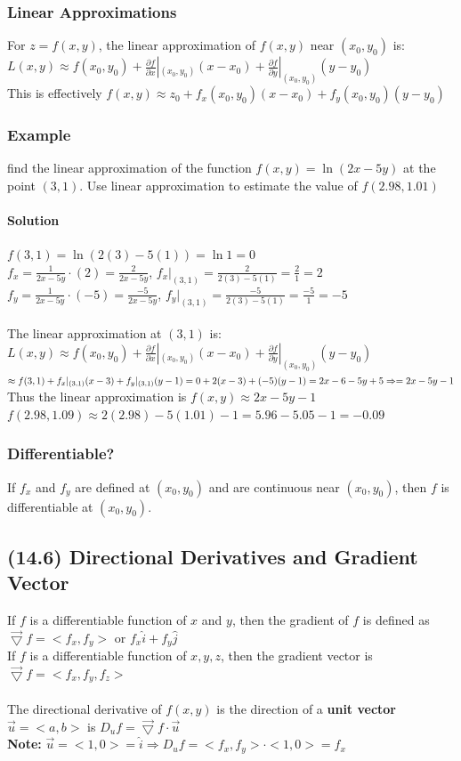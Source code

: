\documentclass{article}
\newcommand{\p}{\partial}
\newcommand{\tri}{\vec{\bigtriangledown}}
\begin{document}
\subsubsection{Linear Approximations}
For $z=f(x,y)$, the linear approximation of $f(x,y)$ near $(x_0,y_0)$ is:
\\$L(x,y)\approx f(x_0,y_0)+\frac{\p f}{\p x}|_{(x_0,y_0)}(x-x_0)+\frac{\p f}{\p y}|_{(x_0,y_0)}(y-y_0)$
\\This is effectively $f(x,y)\approx z_0+f_x(x_0,y_0)(x-x_0)+f_y(x_0,y_0)(y-y_0)$

\newpage\subsubsection{Example}
find the linear approximation of the function $f(x,y)=\ln(2x-5y)$ at the point $(3,1)$.
Use linear approximation to estimate the value of $f(2.98, 1.01)$
\paragraph{Solution} $f(3,1)=\ln(2(3)-5(1))=\ln1=0$
\\$f_x=\frac{1}{2x-5y}\cdot(2)=\frac{2}{2x-5y}$, $f_x|_{(3,1)}=\frac{2}{2(3)-5(1)}=\frac{2}{1}=2$
\\$f_y=\frac{1}{2x-5y}\cdot(-5)=\frac{-5}{2x-5y}$, $f_y|_{(3,1)}=\frac{-5}{2(3)-5(1)}=\frac{-5}{1}=-5$
\\\\The linear approximation at $(3,1)$ is: $L(x,y)\approx f(x_0,y_0)+\frac{\p f}{\p x}|_{(x_0,y_0)}(x-x_0)+\frac{\p f}{\p y}|_{(x_0,y_0)}(y-y_0)$
\\$\approx f(3,1)+f_x|_{(3,1)}(x-3)+f_y|_{(3,1)}(y-1)
\\=0+2(x-3)+(-5)(y-1)
\\=2x-6-5y+5\Rightarrow=2x-5y-1$
\\Thus the linear approximation is $f(x,y)\approx2x-5y-1$
\\$f(2.98,1.09)\approx2(2.98)-5(1.01)-1=5.96-5.05-1=-0.09$

\subsubsection{Differentiable?}
If $f_x$ and $f_y$ are defined at $(x_0,y_0)$ and are continuous near $(x_0,y_0)$,
then $f$ is differentiable at $(x_0,y_0)$.

\subsection{(14.6) Directional Derivatives and Gradient Vector}
If $f$ is a differentiable function of $x$ and $y$, then the gradient of $f$ is defined as
$\tri f=<f_x,f_y>$ or $f_x\hat{i}+f_y\hat{j}$
\\If $f$ is a differentiable function of $x,y,z$, then the gradient vector is
$\tri f=<f_x,f_y,f_z>$
\\\\The directional derivative of $f(x,y)$ is the direction of a \textbf{unit vector $\vec{u}=<a,b>$} is
$D_uf=\tri f\cdot\vec{u}$
\\\textbf{Note:} $\vec{u}=<1,0>=\hat{i}\Rightarrow D_uf=<f_x,f_y>\cdot<1,0>=f_x$
\end{document}
